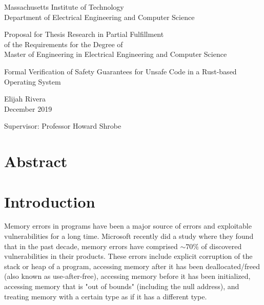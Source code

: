 \documentclass[12pt]{article}
\begin{document}
\begin{titlepage}
   \begin{center}
       \vspace*{1cm}
       Massachusetts Institute of Technology \\
       Department of Electrical Engineering and Computer Science
 
       \vspace{1cm}
       Proposal for Thesis Research in Partial Fulfillment \\
       of the Requirements for the Degree of \\
       Master of Engineering in Electrical Engineering and Computer Science
 
       \vspace{1cm}
 
       Formal Verification of Safety Guarantees for Unsafe Code in a Rust-based Operating System
 
       \vspace{1cm}
       Elijah Rivera \\
       December 2019
 
       \vspace{1cm}
        Supervisor: Professor Howard Shrobe
   \end{center}
\end{titlepage}

\section{Abstract}

\section{Introduction}

Memory errors in programs have been a major source of errors and exploitable vulnerabilities for a long time. Microsoft recently did a study where they found that in the past decade, memory errors have comprised $\sim70\%$ of discovered vulnerabilities in their products. %
These errors include explicit corruption of the stack or heap of a program, accessing memory after it has been deallocated/freed (also known as use-after-free), accessing memory before it has been initialized, accessing memory that is "out of bounds" (including the null address), and treating memory with a certain type as if it has a different type.
\end{document}
